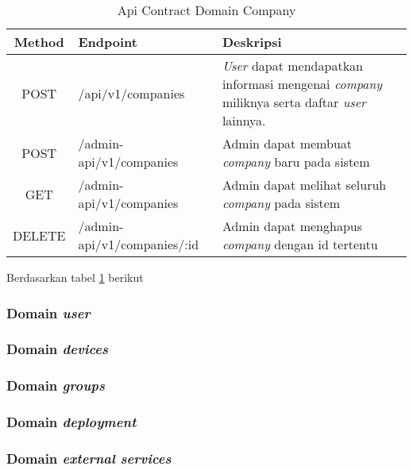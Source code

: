 \bgroup
\begin{table}[ht]
  \caption{Api Contract Domain Company}
  \label{tab:api-contract-domain-company}
  \def\arraystretch{1.7}
  \centering
  \begin{tabular}{|c|p{5cm}|p{6cm}|}
    \hline
    Method & Endpoint                    &
    Deskripsi                                                                                                                                               \\
    \hline
    POST   & /api/v1/companies           & \textit{User} dapat mendapatkan informasi mengenai \textit{company} miliknya serta daftar \textit{user} lainnya. \\
    \hline
    POST   & /admin-api/v1/companies     & Admin dapat membuat \textit{company} baru pada sistem                                                            \\
    \hline
    GET    & /admin-api/v1/companies     & Admin dapat melihat seluruh \textit{company} pada sistem                                                         \\
    \hline
    DELETE & /admin-api/v1/companies/:id & Admin dapat menghapus \textit{company} dengan id tertentu                                                        \\
    \hline
  \end{tabular}
\end{table}
\egroup

Berdasarkan tabel \ref{tab:api-contract-domain-company} berikut

\subsubsection{Domain \textit{user}}
\subsubsection{Domain \textit{devices}}
\subsubsection{Domain \textit{groups}}
\subsubsection{Domain \textit{deployment}}
\subsubsection{Domain \textit{external services}}